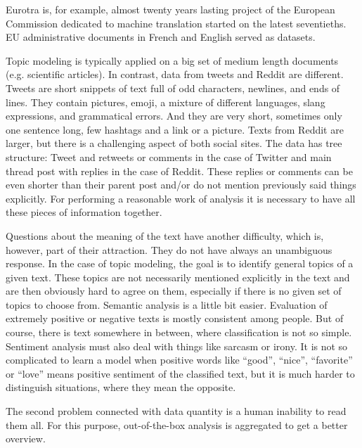 Eurotra \cite{diane1995final} is, for example, almost twenty years lasting project of the European Commission dedicated to machine translation started on the latest seventieths. EU administrative documents in French and English served as datasets. \par
Topic modeling is typically applied on a big set of medium length documents (e.g.  scientific articles). In contrast, data from tweets and Reddit are different. Tweets are short snippets of text full of odd characters, newlines, and ends of lines. They contain pictures, emoji, a mixture of different languages, slang expressions, and grammatical errors. And they are very short, sometimes only one sentence long, few hashtags and a link or a picture.
Texts from Reddit are larger, but there is a challenging aspect of both social sites. The data has tree structure: Tweet and retweets or comments in the case of Twitter and main thread post with replies in the case of Reddit. These replies or comments can be even shorter than their parent post and/or do not mention previously said things explicitly. For performing a reasonable work of analysis it is necessary to have all these pieces of information together. \par Questions about the meaning of the text have another difficulty, which is, however, part of their attraction. They do not have always an unambiguous response. In the case of topic modeling, the goal is to identify general topics of a given text. These topics are not necessarily mentioned explicitly in the text and are then obviously hard to agree on them, especially if there is no given set of topics to choose from. Semantic analysis is a little bit easier. Evaluation of extremely positive or negative texts is mostly consistent among people. But of course, there is text somewhere in between, where classification is not so simple. Sentiment analysis must also deal with things like sarcasm or irony. It is not so complicated to learn a model when positive words like ``good'', ``nice'', ``favorite'' or ``love'' means positive sentiment of the classified text, but it is much harder to distinguish situations, where they mean the opposite.

The second problem connected with data quantity is a human inability to read them all. For this purpose, out-of-the-box analysis is aggregated to get a better overview. \par
